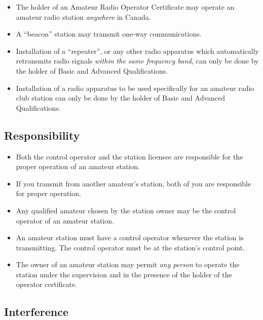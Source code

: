 \documentclass[letterpaper,12pt]{scrartcl}
\begin{document}
\begin{itemize}
\item The holder of an Amateur Radio Operator Certificate may operate an amateur radio station \textit{anywhere} in Canada.
\item A ``beacon'' station may transmit one-way communications.
\item Installation of a ``repeater'', or any other radio apparatus which automatically retransmits radio signals \textit{within the same frequency band},
can only be done by the holder of Basic and Advanced Qualifications.
\item Installation of a radio apparatus to be used specifically for an amateur radio club station can only be done by the holder of Basic and Advanced Qualifications.
\end{itemize}

\subsection{Responsibility}

\begin{itemize}
\item Both the control operator and the station licensee are responsible for the proper operation of an amateur station.
\item If you transmit from another amateur's station, both of you are responsible for proper operation.
\item Any qualified amateur chosen by the station owner may be the control operator of an amateur station.
\item An amateur station must have a control operator whenever the station is transmitting.
The control operator must be at the station's control point.
\item The owner of an amateur station may permit \textit{any person} to operate the station under the supervision and in the presence of the holder
of the operator certificate.
\end{itemize}

\subsection{Interference}
\end{document}
